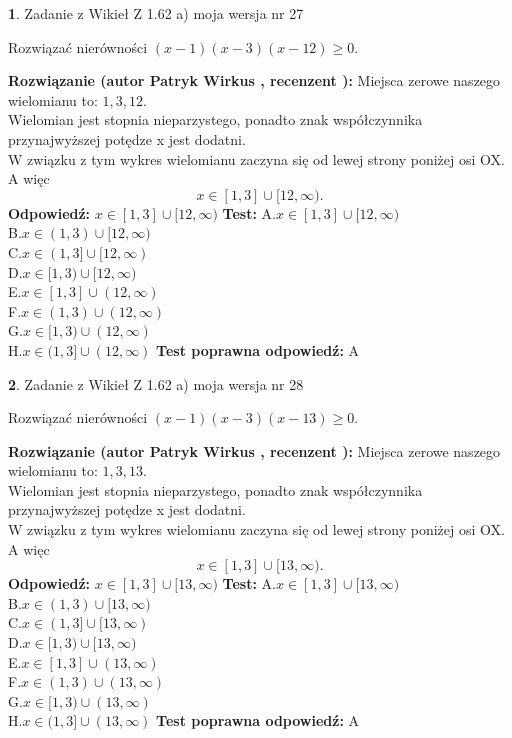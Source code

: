 \documentclass[12pt, a4paper]{article}
\theoremstyle{definition} %
\newtheorem{zad}{}
\newcommand{\zadStart}[1]{\begin{zad}#1\newline}
\newcommand{\zadStop}{\end{zad}}
\newcommand{\rozwStart}[2]{\noindent \textbf{Rozwiązanie (autor #1 , recenzent #2): }\newline}
\newcommand{\rozwStop}{\newline}
\newcommand{\odpStart}{\noindent \textbf{Odpowiedź:}\newline}
\newcommand{\odpStop}{\newline}
\newcommand{\testStart}{\noindent \textbf{Test:}\newline}
\newcommand{\testStop}{\newline}
\newcommand{\kluczStart}{\noindent \textbf{Test poprawna odpowiedź:}\newline}
\newcommand{\kluczStop}{\newline}
\begin{document}
\zadStart{Zadanie z Wikieł Z 1.62 a) moja wersja nr 27}

Rozwiązać nierówności $(x-1)(x-3)(x-12)\ge0$.
\zadStop
\rozwStart{Patryk Wirkus}{}
Miejsca zerowe naszego wielomianu to: $1, 3, 12$.\\
Wielomian jest stopnia nieparzystego, ponadto znak współczynnika przy\linebreak najwyższej potędze x jest dodatni.\\ W związku z tym wykres wielomianu zaczyna się od lewej strony poniżej osi OX. A więc $$x \in [1,3] \cup [12,\infty).$$
\rozwStop
\odpStart
$x \in [1,3] \cup [12,\infty)$
\odpStop
\testStart
A.$x \in [1,3] \cup [12,\infty)$\\
B.$x \in (1,3) \cup [12,\infty)$\\
C.$x \in (1,3] \cup [12,\infty)$\\
D.$x \in [1,3) \cup [12,\infty)$\\
E.$x \in [1,3] \cup (12,\infty)$\\
F.$x \in (1,3) \cup (12,\infty)$\\
G.$x \in [1,3) \cup (12,\infty)$\\
H.$x \in (1,3] \cup (12,\infty)$
\testStop
\kluczStart
A
\kluczStop



\zadStart{Zadanie z Wikieł Z 1.62 a) moja wersja nr 28}

Rozwiązać nierówności $(x-1)(x-3)(x-13)\ge0$.
\zadStop
\rozwStart{Patryk Wirkus}{}
Miejsca zerowe naszego wielomianu to: $1, 3, 13$.\\
Wielomian jest stopnia nieparzystego, ponadto znak współczynnika przy\linebreak najwyższej potędze x jest dodatni.\\ W związku z tym wykres wielomianu zaczyna się od lewej strony poniżej osi OX. A więc $$x \in [1,3] \cup [13,\infty).$$
\rozwStop
\odpStart
$x \in [1,3] \cup [13,\infty)$
\odpStop
\testStart
A.$x \in [1,3] \cup [13,\infty)$\\
B.$x \in (1,3) \cup [13,\infty)$\\
C.$x \in (1,3] \cup [13,\infty)$\\
D.$x \in [1,3) \cup [13,\infty)$\\
E.$x \in [1,3] \cup (13,\infty)$\\
F.$x \in (1,3) \cup (13,\infty)$\\
G.$x \in [1,3) \cup (13,\infty)$\\
H.$x \in (1,3] \cup (13,\infty)$
\testStop
\kluczStart
A
\kluczStop
\end{document}
